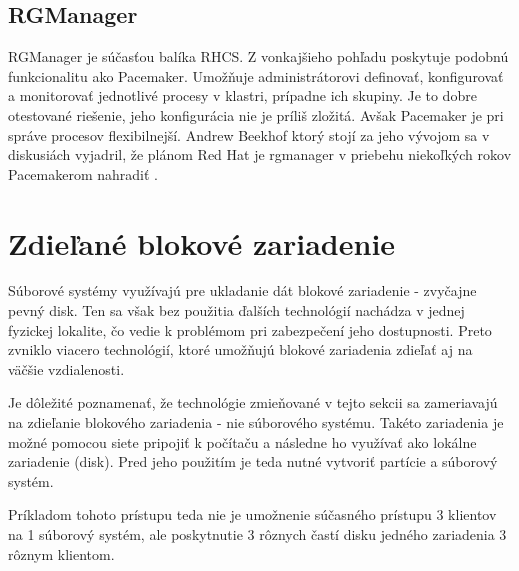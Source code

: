 \subsection{RGManager}
RGManager je súčasťou balíka RHCS. Z vonkajšieho pohľadu poskytuje podobnú funkcionalitu ako Pacemaker. Umožňuje administrátorovi definovať, konfigurovať a monitorovať jednotlivé procesy v klastri, prípadne ich skupiny. Je to dobre otestované riešenie, jeho konfigurácia nie je príliš zložitá. Avšak Pacemaker je pri správe procesov flexibilnejší. Andrew Beekhof ktorý stojí za jeho vývojom sa v diskusiách vyjadril, že plánom Red Hat je rgmanager v priebehu niekoľkých rokov Pacemakerom nahradiť \cite{web:msg00023}.


\section{Zdieľané blokové zariadenie}
\label{lbl:sec:zdielane-blokove-zariadenie}
Súborové systémy využívajú pre ukladanie dát blokové zariadenie - zvyčajne pevný disk. Ten sa však bez použitia ďalších technológií nachádza v jednej fyzickej lokalite, čo vedie k problémom pri zabezpečení jeho dostupnosti. Preto zvniklo viacero technológií, ktoré umožňujú blokové zariadenia zdieľať aj na väčšie vzdialenosti.

Je dôležité poznamenať, že technológie zmieňované v tejto sekcii sa zameriavajú na zdieľanie blokového zariadenia - nie súborového systému. Takéto zariadenia je možné pomocou siete pripojiť k počítaču a následne ho využívať ako lokálne zariadenie (disk). Pred jeho použitím je teda nutné vytvoriť partície a súborový systém.

Príkladom tohoto prístupu teda nie je umožnenie súčasného prístupu 3 klientov na 1 súborový systém, ale poskytnutie 3 rôznych častí disku jedného zariadenia 3 rôznym klientom.

